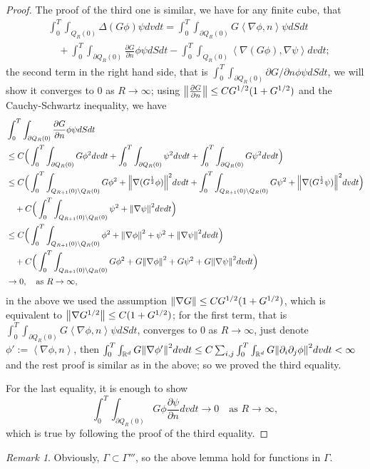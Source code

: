 \documentclass[a4paper, 11pt]{article}
\newcommand{\inner}[2]{\left< #1 , #2 \right>}
\newcounter{results}[section]
\theoremstyle{plain}
\theoremstyle{remark}
\newtheorem{remark}[results]{Remark}
\theoremstyle{definition}
\newcommand{\intd}{\int_{\mathbb{R}^d}}
\newcommand{\intt}{\int_0^T}
\begin{document}
\begin{proof}
	The proof of the third one is similar, we have for any finite cube, that
	\begin{equation*}
		\begin{aligned}
			&\intt\int_{Q_R(0)} \Delta\left(G\phi\right)\psi dvdt=\intt\int_{\partial Q_R(0)}G\inner{\nabla\phi}{n}\psi dSdt\\
			&\quad+\intt\int_{\partial Q_R(0)}\frac{\partial G}{\partial n}\phi\psi dSdt-\intt\int_{Q_R(0)} \inner{\nabla\left(G\phi\right)}{\nabla\psi}dvdt;
		\end{aligned}
	\end{equation*}
	the second term in the right hand side, that is $\intt\int_{\partial Q_R(0)}{\partial G}/{\partial n}\phi\psi dSdt$, we will show it converges to $0$ as $R\to\infty$; using $\norm{\frac{\partial G}{\partial n}}\leq CG^{1/2}(1+G^{1/2})$ and the Cauchy-Schwartz inequality, we have
	\begin{equation}
		\begin{aligned}
			&\intt\int_{\partial Q_R(0)}\frac{\partial G}{\partial n}\phi\psi dSdt\\
			&\leq C\Big(\intt \int_{\partial Q_R(0)}G\phi^2dvdt+\intt \int_{\partial Q_R(0)}\psi^2dvdt+\intt \int_{\partial Q_R(0)}G\psi^2dvdt\Big)\\
			&\leq C\Big(\intt\int_{Q_{R+1}(0)\setminus Q_R(0)}G\phi^2+\norm{\nabla(G^{\frac{1}{2}}\phi)}^2dvdt+\intt\int_{Q_{R+1}(0)\setminus Q_R(0)}G\psi^2+\norm{\nabla(G^{\frac{1}{2}}\psi)}^2dvdt\Big)\\
			&\quad+C\Big(\intt\int_{Q_{R+1}(0)\setminus Q_R(0)} \psi^2+\norm{\nabla\psi}^2dvdt\Big)\\
			&\leq C\Big(\intt\int_{Q_{R+1}(0)\setminus Q_R(0)}\phi^2+\norm{\nabla\phi}^2+\psi^2+\norm{\nabla\psi}^2dvdt\Big)\\
			&\quad+C\Big(\intt\int_{Q_{R+1}(0)\setminus Q_R(0)}G\phi^2+G\norm{\nabla\phi}^2+G\psi^2+G\norm{\nabla\psi}^2dvdt\Big)\\
			&\to 0,\quad \text{as }R\to\infty,
		\end{aligned}
	\end{equation}
	in the above we used the assumption $\norm{\nabla G}\leq CG^{1/2}(1+G^{1/2})$, which is equivalent to $\norm{\nabla G^{1/2}}\leq C(1+G^{1/2})$; for the first term, that is $\intt\int_{\partial Q_R(0)}G\inner{\nabla\phi}{n}\psi dSdt$, converges to $0$ as $R\to\infty$,  just denote $\phi':=\inner{\nabla\phi}{n}$, then $\intt\intd G\norm{\nabla\phi'}^2dvdt\leq C\sum_{i,j}\intt\intd G\norm{\partial_i\partial_j\phi}^2dvdt<\infty$ and the rest proof is similar as in the above; so we proved the third equality.
	
	For the last equality, it is enough to show 
	\begin{equation}
		\intt\int_{\partial Q_R(0)}G\phi\frac{\partial\psi}{\partial n}dvdt\to 0\quad \text{as } R\to\infty,
	\end{equation}
	which is true by following the proof of the third equality.
\end{proof}
\begin{remark}
    Obviously, $\Gamma\subset\Gamma'''$, so the above lemma hold for functions in $\Gamma$.
\end{remark}
\end{document}
